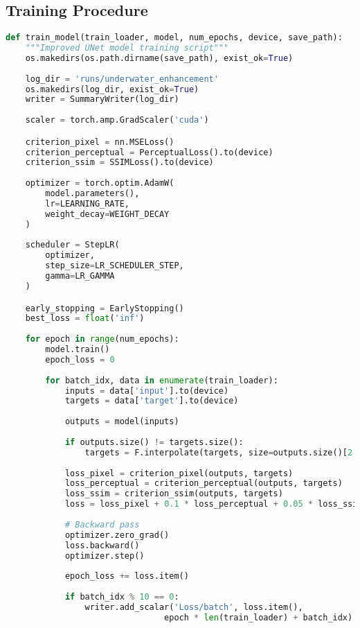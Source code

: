 \documentclass{apmcmthesis}
\begin{document}
\subsection{Training Procedure}
\begin{lstlisting}[language=python,caption={Training Script}]
def train_model(train_loader, model, num_epochs, device, save_path):
    """Improved UNet model training script"""
    os.makedirs(os.path.dirname(save_path), exist_ok=True)
    
    log_dir = 'runs/underwater_enhancement'
    os.makedirs(log_dir, exist_ok=True)
    writer = SummaryWriter(log_dir)
    
    scaler = torch.amp.GradScaler('cuda')

    criterion_pixel = nn.MSELoss()
    criterion_perceptual = PerceptualLoss().to(device)
    criterion_ssim = SSIMLoss().to(device)
    
    optimizer = torch.optim.AdamW(
        model.parameters(),
        lr=LEARNING_RATE,
        weight_decay=WEIGHT_DECAY
    )
    
    scheduler = StepLR(
        optimizer, 
        step_size=LR_SCHEDULER_STEP,
        gamma=LR_GAMMA
    )

    early_stopping = EarlyStopping()
    best_loss = float('inf')
    
    for epoch in range(num_epochs):
        model.train()
        epoch_loss = 0
        
        for batch_idx, data in enumerate(train_loader):
            inputs = data['input'].to(device)
            targets = data['target'].to(device)
            
            outputs = model(inputs)
            
            if outputs.size() != targets.size():
                targets = F.interpolate(targets, size=outputs.size()[2:], mode='bilinear', align_corners=False)
            
            loss_pixel = criterion_pixel(outputs, targets)
            loss_perceptual = criterion_perceptual(outputs, targets)
            loss_ssim = criterion_ssim(outputs, targets)
            loss = loss_pixel + 0.1 * loss_perceptual + 0.05 * loss_ssim
            
            # Backward pass
            optimizer.zero_grad()
            loss.backward()
            optimizer.step()
            
            epoch_loss += loss.item()
            
            if batch_idx % 10 == 0:
                writer.add_scalar('Loss/batch', loss.item(), 
                                epoch * len(train_loader) + batch_idx)


\end{lstlisting}
\end{document}
